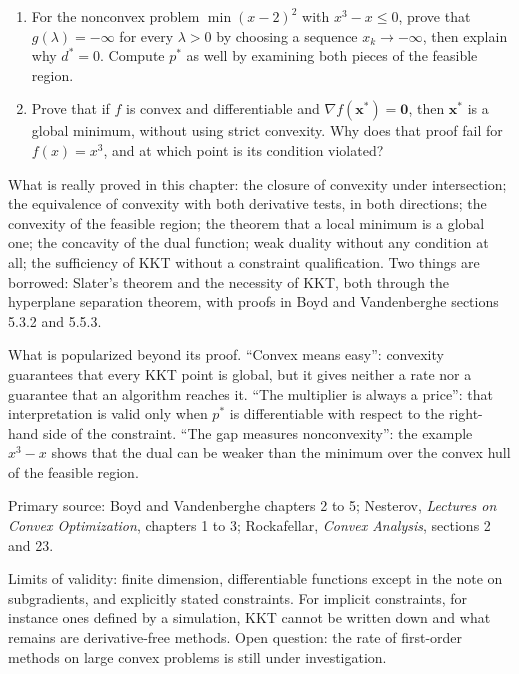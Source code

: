 \begin{latihan}
\begin{enumerate}
  \item For the nonconvex problem $\min (x-2)^{2}$ with $x^{3}-x\le0$, prove that
        $g(\lambda)=-\infty$ for every $\lambda>0$ by choosing a sequence
        $x_{k}\to-\infty$, then explain why $d^{*}=0$. Compute $p^{*}$ as well by
        examining both pieces of the feasible region.

  \item Prove that if $f$ is convex and differentiable and
        $\nabla f(\mathbf{x}^{*})=\mathbf{0}$, then $\mathbf{x}^{*}$ is a global minimum,
        without using strict convexity. Why does that proof fail for $f(x)=x^{3}$,
        and at which point is its condition violated?
\end{enumerate}
\end{latihan}

\begin{untukpeneliti}
What is really proved in this chapter: the closure of convexity under intersection; the
equivalence of convexity with both derivative tests, in both directions; the convexity of the
feasible region; the theorem that a local minimum is a global one; the concavity of the dual
function; weak duality without any condition at all; the sufficiency of KKT without a constraint
qualification. Two things are borrowed: Slater's theorem and the necessity of KKT, both through
the hyperplane separation theorem, with proofs in Boyd and Vandenberghe sections 5.3.2 and 5.5.3.

What is popularized beyond its proof. ``Convex means easy'': convexity guarantees that every KKT
point is global, but it gives neither a rate nor a guarantee that an algorithm reaches it. ``The
multiplier is always a price'': that interpretation is valid only when $p^{*}$ is differentiable
with respect to the right-hand side of the constraint. ``The gap measures nonconvexity'': the
example $x^{3}-x$ shows that the dual can be weaker than the minimum over the convex hull of the
feasible region.

Primary source: Boyd and Vandenberghe chapters 2 to 5; Nesterov, \emph{Lectures on Convex
Optimization}, chapters 1 to 3; Rockafellar, \emph{Convex Analysis}, sections 2 and 23.

Limits of validity: finite dimension, differentiable functions except in the note on
subgradients, and explicitly stated constraints. For implicit constraints, for instance ones
defined by a simulation, KKT cannot be written down and what remains are derivative-free methods.
Open question: the rate of first-order methods on large convex problems is still under
investigation.
\end{untukpeneliti}

